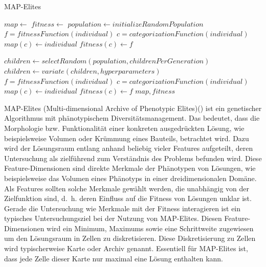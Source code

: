 \label{sub:mapElites}
\begin{algorithm}
	\caption{MAP-Elites} 
	\label{alg:mapElites}
	\begin{algorithmic}[1]
		\State $map \gets $ 
		\State $fitness \gets $ 
		\State $population \gets initializeRandomPopulation$ 
			\State $f = fitnessFunction(individual)$
			\State $c = categorizationFunction(individual)$ 
			 
				\State $map(c) \gets individual$
				\State $fitness(c) \gets f$
			\EndIf
		\EndFor
		
			\State $children \gets selectRandom(population,childrenPerGeneration)$ 
			\State $children \gets variate(children,hyperparameters)$ 
				\State $f = fitnessFunction(individual)$
				\State $c = categorizationFunction(individual)$
					\State $map(c) \gets individual$
					\State $fitness(c) \gets f$
				\EndIf
			\EndFor
		\EndFor
		\Return $map,fitness$
		\EndProcedure
	\end{algorithmic}
\end{algorithm}
MAP-Elites (Multi-dimensional Archive of Phenotypic Elites)(\cite{Mouret.4202015}) ist ein genetischer Algorithmus mit phänotypischem Diversitätsmanagement.
Das bedeutet, dass die Morphologie bzw. Funktionalität einer konkreten ausgedrückten Lösung, wie beispielsweise Volumen oder Krümmung eines Bauteils, betrachtet wird.
Dazu wird der Lösungsraum entlang anhand beliebig vieler Features aufgeteilt, deren Untersuchung als zielführend zum Verständnis des Problems befunden wird.
Diese Feature-Dimensionen sind direkte Merkmale der Phänotypen von Lösungen, wie beispielsweise das Volumen eines Phänotyps in einer dreidimensionalen Domäne.
Als Features sollten solche Merkmale gewählt werden, die unabhängig von der Zielfunktion sind, d.~h. deren Einfluss auf die Fitness von Lösungen unklar ist.
Gerade die Untersuchung wie Merkmale mit der Fitness interagieren ist ein typisches Untersuchungsziel bei der Nutzung von MAP-Elites.
Diesen Feature-Dimensionen wird ein Minimum, Maximums sowie eine Schrittweite zugewiesen um den Lösungsraum in Zellen zu diskretisieren.
Diese Diskretisierung zu Zellen wird typischerweise Karte oder Archiv genannt.
Essentiell für MAP-Elites ist, dass jede Zelle dieser Karte nur maximal eine Lösung enthalten kann.

